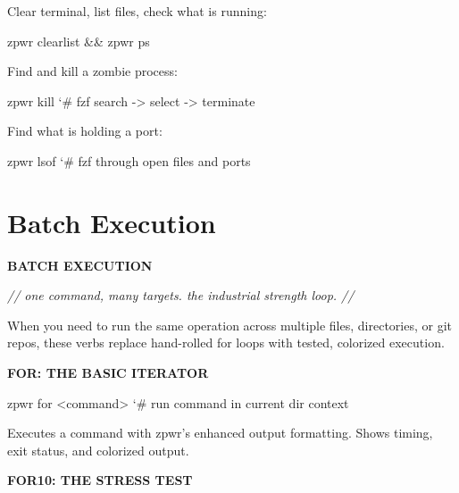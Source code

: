 \documentclass[11pt,a4paper,twoside]{book}
\begin{document}
Clear terminal, list files, check what is running:

\begin{codebox}
\color{neongreen}zpwr clearlist \&\& zpwr ps\\
\end{codebox}

Find and kill a zombie process:

\begin{codebox}
\color{neongreen}zpwr kill     {\char`\#} fzf search -> select -> terminate\\
\end{codebox}

Find what is holding a port:

\begin{codebox}
\color{neongreen}zpwr lsof     {\char`\#} fzf through open files and ports\\
\end{codebox}


\vspace{16pt}

\section{Batch Execution}


\vspace{10pt}
{\large\bfseries\color{neoncyan} BATCH EXECUTION}\vspace{6pt}

{\small\itshape\color{dimtext} // one command, many targets. the industrial strength loop. //}

When you need to run the same operation across multiple files, directories, or git repos, these verbs replace hand-rolled for loops with tested, colorized execution.


\vspace{12pt}
{\bfseries\color{neonyellow} FOR: THE BASIC ITERATOR}\vspace{4pt}

\begin{codebox}
\color{neongreen}zpwr for <command>                  {\char`\#} run command in current dir context\\
\end{codebox}

Executes a command with zpwr's enhanced output formatting. Shows timing, exit status, and colorized output.


\vspace{12pt}
{\bfseries\color{neonyellow} FOR10: THE STRESS TEST}\vspace{4pt}
\end{document}
